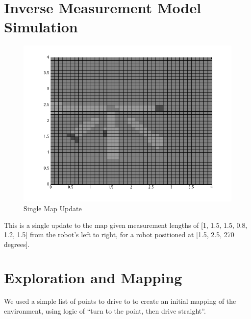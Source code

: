 \documentclass[12pt]{article}
\begin{document}
\newpage
\singlespacing
\section{Inverse Measurement Model Simulation}
\setlength{\parindent}{1cm}

\begin{figure}[ht]
\hspace{0.5cm}
\centering
\includegraphics[scale=0.5]{Pictures/question2.png}
\caption{Single Map Update}
\end{figure}

This is a single update to the map given measurement lengths of [1, 1.5, 1.5, 0.8, 1.2, 1.5] from the robot’s left to right, for a robot positioned at [1.5, 2.5, 270 degrees].

\newpage
\singlespacing
\section{Exploration and Mapping}
\setlength{\parindent}{1cm}

We used a simple list of points to drive to to create an initial mapping of the environment, using logic of ``turn to the point, then drive straight''.
\end{document}

